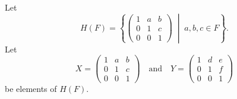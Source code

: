  Let
\begin{equation*}
  H(F) = \left\{
    \begin{pmatrix}
      1 & a & b \\
      0 & 1 & c \\
      0 & 0 & 1
    \end{pmatrix}
    \;\middle|\;
    a,b,c\in F
  \right\}.
\end{equation*}
Let
\begin{equation*}
  X =
  \begin{pmatrix}
    1 & a & b \\
    0 & 1 & c \\
    0 & 0 & 1
  \end{pmatrix}
  \quad\text{and}\quad
  Y =
  \begin{pmatrix}
    1 & d & e \\
    0 & 1 & f \\
    0 & 0 & 1
  \end{pmatrix}
\end{equation*}
be elements of $H(F)$.
